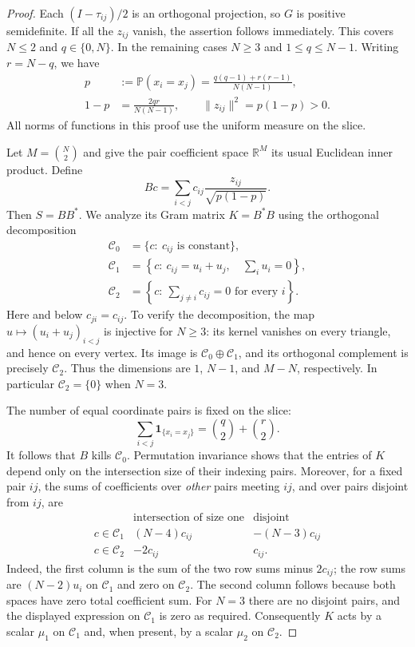 \begin{proof}
Each $(I-\tau_{ij})/2$ is an orthogonal projection, so $G$ is positive
semidefinite. If all the $z_{ij}$ vanish, the assertion follows immediately.
This covers $N\le2$ and $q\in\{0,N\}$. In the remaining cases $N\ge3$ and
$1\le q\le N-1$. Writing $r=N-q$, we have
\begin{equation}
 \begin{aligned}
 p&:=\mathbb P(x_i=x_j)
   =\frac{q(q-1)+r(r-1)}{N(N-1)},\\
 1-p&=\frac{2qr}{N(N-1)},\qquad
 \|z_{ij}\|^2=p(1-p)>0.
 \end{aligned}
 \label{sl:p}
\end{equation}
All norms of functions in this proof use the uniform measure on the slice.

Let $M=\binom N2$ and give the pair coefficient space $\mathbb R^M$ its
usual Euclidean inner product. Define
\[
 Bc=\sum_{i<j}c_{ij}\frac{z_{ij}}{\sqrt{p(1-p)}}.
\]
Then $S=BB^*$. We analyze its Gram matrix $K=B^*B$ using the orthogonal
decomposition
\begin{align*}
 \mathcal C_0&=\{c:\ c_{ij}\text{ is constant}\},\\
 \mathcal C_1&=\left\{c:\ c_{ij}=u_i+u_j,\quad\sum_i u_i=0\right\},\\
 \mathcal C_2&=\left\{c:\ \sum_{j\ne i}c_{ij}=0\text{ for every }i\right\}.
\end{align*}
Here and below $c_{ji}=c_{ij}$. To verify the decomposition, the map
$u\mapsto(u_i+u_j)_{i<j}$ is injective for $N\ge3$: its kernel vanishes on
every triangle, and hence on every vertex. Its image is
$\mathcal C_0\oplus\mathcal C_1$, and its orthogonal complement is precisely
$\mathcal C_2$. Thus the dimensions are $1$, $N-1$, and $M-N$, respectively.
In particular $\mathcal C_2=\{0\}$ when $N=3$.

The number of equal coordinate pairs is fixed on the slice:
\[
 \sum_{i<j}\mathbf 1_{\{x_i=x_j\}}=\binom q2+\binom r2.
\]
It follows that $B$ kills $\mathcal C_0$. Permutation invariance shows that
the entries of $K$ depend only on the intersection size of their indexing
pairs. Moreover, for a fixed pair $ij$, the sums of coefficients over
\emph{other} pairs meeting $ij$, and over pairs disjoint from $ij$, are
\[
 \begin{array}{c|cc}
 &\text{intersection of size one}&\text{disjoint}\\ \hline
 c\in\mathcal C_1&(N-4)c_{ij}&-(N-3)c_{ij}\\
 c\in\mathcal C_2&-2c_{ij}&c_{ij}.
 \end{array}
\]
Indeed, the first column is the sum of the two row sums minus $2c_{ij}$;
the row sums are $(N-2)u_i$ on $\mathcal C_1$ and zero on $\mathcal C_2$.
The second column follows because both spaces have zero total coefficient
sum. For $N=3$ there are no disjoint pairs, and the displayed expression
on $\mathcal C_1$ is zero as required. Consequently $K$ acts by a scalar
$\mu_1$ on $\mathcal C_1$ and, when present, by a scalar $\mu_2$ on
$\mathcal C_2$.


\end{proof}
